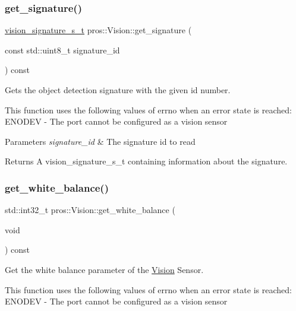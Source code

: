 \subsubsection{\texorpdfstring{get\+\_\+signature()}{get\_signature()}}
{\footnotesize\ttfamily \hyperlink{vision_8h_a135c729c7277f6cc019c2924088a5fd5}{vision\+\_\+signature\+\_\+s\+\_\+t} pros\+::\+Vision\+::get\+\_\+signature (\begin{DoxyParamCaption}\item[{const std\+::uint8\+\_\+t}]{signature\+\_\+id }\end{DoxyParamCaption}) const}



Gets the object detection signature with the given id number. 

This function uses the following values of errno when an error state is reached\+: E\+N\+O\+D\+EV -\/ The port cannot be configured as a vision sensor


\begin{DoxyParams}{Parameters}
{\em signature\+\_\+id} & The signature id to read\\
\hline
\end{DoxyParams}
\begin{DoxyReturn}{Returns}
A vision\+\_\+signature\+\_\+s\+\_\+t containing information about the signature. 
\end{DoxyReturn}
\mbox{\label{classpros_1_1Vision_a7a89ad6812bfd46e24e69e1dc2f55039}} 
\subsubsection{\texorpdfstring{get\+\_\+white\+\_\+balance()}{get\_white\_balance()}}
{\footnotesize\ttfamily std\+::int32\+\_\+t pros\+::\+Vision\+::get\+\_\+white\+\_\+balance (\begin{DoxyParamCaption}\item[{void}]{ }\end{DoxyParamCaption}) const}



Get the white balance parameter of the \hyperlink{classpros_1_1Vision}{Vision} Sensor. 

This function uses the following values of errno when an error state is reached\+: E\+N\+O\+D\+EV -\/ The port cannot be configured as a vision sensor

